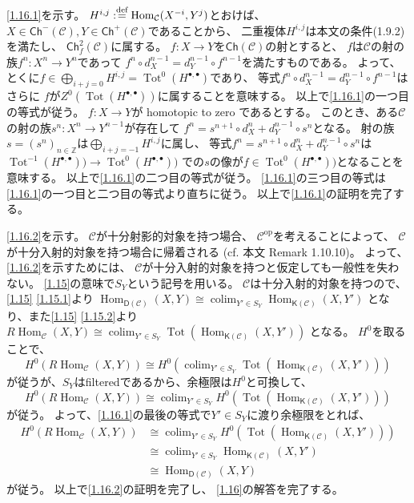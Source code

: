 \documentclass[uplatex,dvipdfmx]{jsarticle}
\makeatletter
\theoremstyle{definition}
\renewenvironment{proof}[1][\proofname]{
  \pushQED{\qed}%
  \normalfont \topsep6\p@\@plus6\p@\relax
  \trivlist
  \item[\hskip\labelsep
    #1\@addpunct{\textbf{.}}]\ignorespaces
}{%
  \popQED\endtrivlist\@endpefalse
}
\providecommand{\proofname}{証明}
\DeclareMathOperator{\Hom}{\mathrm{Hom}}
\newcommand{\op}{\mathrm{op}}
\DeclareMathOperator{\Tot}{\mathrm{Tot}}
\DeclareMathOperator{\colim}{\mathrm{colim}}
\newcommand{\Ch}{\mathsf{Ch}}
\newcommand{\sfK}{\mathsf{K}}
\newcommand{\sfD}{\mathsf{D}}
\newcommand\Z{\mathbb{Z}}
\newcommand\mcC{\mathcal{C}}
\def\dfn{:\overset{\mbox{{\scriptsize def}}}{=}}
\makeatother
\begin{document}
\begin{proof}
  \ref{1.16.1}を示す。
  \(H^{i,j} \dfn \Hom_{\mcC}(X^{-i},Y^j)\)とおけば、
  \(X\in \Ch^-(\mcC), Y\in \Ch^+(\mcC)\)であることから、
  二重複体\(H^{i,j}\)は本文の条件(1.9.2)を満たし、
  \(\Ch^2_f(\mcC)\)に属する。
  \(f:X\to Y\)を\(\Ch(\mcC)\)の射とすると、
  \(f\)は\(\mcC\)の射の族\(f^n:X^n\to Y^n\)であって
  \(f^n\circ d_X^{n-1} = d_Y^{n-1}\circ f^{n-1}\)を満たすものである。
  よって、とくに\(f\in \bigoplus_{i+j = 0} H^{i,j} = \Tot^0(H^{\bullet,\bullet})\)であり、
  等式\(f^n\circ d_X^{n-1} = d_Y^{n-1}\circ f^{n-1}\)はさらに
  \(f\)が\(Z^0(\Tot(H^{\bullet,\bullet}))\)に属することを意味する。
  以上で\ref{1.16.1}の一つ目の等式が従う。
  \(f:X\to Y\)が homotopic to zero であるとする。
  このとき、ある\(\mcC\)の射の族\(s^n:X^n\to Y^{n-1}\)が存在して
  \(f^n = s^{n+1}\circ d_X^n + d_Y^{n-1} \circ s^n\)となる。
  射の族\(s=(s^n)_{n\in \Z}\)は\(\bigoplus_{i+j=-1}H^{i,j}\)に属し、
  等式\(f^n = s^{n+1}\circ d_X^n + d_Y^{n-1} \circ s^n\)は
  \(\Tot^{-1}(H^{\bullet,\bullet}))\to \Tot^0(H^{\bullet,\bullet}))\)
  での\(s\)の像が\(f\in \Tot^0(H^{\bullet,\bullet}))\)となることを意味する。
  以上で\ref{1.16.1}の二つ目の等式が従う。
  \ref{1.16.1}の三つ目の等式は\ref{1.16.1}の一つ目と二つ目の等式より直ちに従う。
  以上で\ref{1.16.1}の証明を完了する。

  \ref{1.16.2}を示す。
  \(\mcC\)が十分射影的対象を持つ場合、
  \(\mcC^{\op}\)を考えることによって、
  \(\mcC\)が十分入射的対象を持つ場合に帰着される (cf. 本文 Remark 1.10.10)。
  よって、\ref{1.16.2}を示すためには、
  \(\mcC\)が十分入射的対象を持つと仮定しても一般性を失わない。
  \autoref{1.15}の意味で\(S_Y\)という記号を用いる。
  \(\mcC\)は十分入射的対象を持つので、
  \autoref{1.15} \ref{1.15.1}より
  \(\Hom_{\sfD(\mcC)}(X,Y) \cong \colim_{Y'\in S_Y}\Hom_{\sfK(\mcC)}(X,Y')\)
  となり、また\autoref{1.15} \ref{1.15.2}より
  \(R\Hom_{\mcC}(X,Y) \cong \colim_{Y'\in S_Y}\Tot(\Hom_{\sfK(\mcC)}(X,Y'))\)
  となる。
  \(H^0\)を取ることで、
  \[
  H^0(R\Hom_{\mcC}(X,Y))
  \cong H^0(\colim_{Y'\in S_Y}\Tot(\Hom_{\sfK(\mcC)}(X,Y')))
  \]
  が従うが、\(S_Y\)はfilteredであるから、余極限は\(H^0\)と可換して、
  \[
  H^0(R\Hom_{\mcC}(X,Y)) \cong
  \colim_{Y'\in S_Y}H^0(\Tot(\Hom_{\sfK(\mcC)}(X,Y')))
  \]
  が従う。
  よって、\ref{1.16.1}の最後の等式で\(Y'\in S_Y\)に渡り余極限をとれば、
  \begin{align*}
    H^0(R\Hom_{\mcC}(X,Y))
    &\cong \colim_{Y'\in S_Y}H^0(\Tot(\Hom_{\sfK(\mcC)}(X,Y'))) \\
    &\cong \colim_{Y'\in S_Y}\Hom_{\sfK(\mcC)}(X,Y') \\
    &\cong \Hom_{\sfD(\mcC)}(X,Y)
  \end{align*}
  が従う。
  以上で\ref{1.16.2}の証明を完了し、
  \autoref{1.16}の解答を完了する。
\end{proof}
\end{document}
